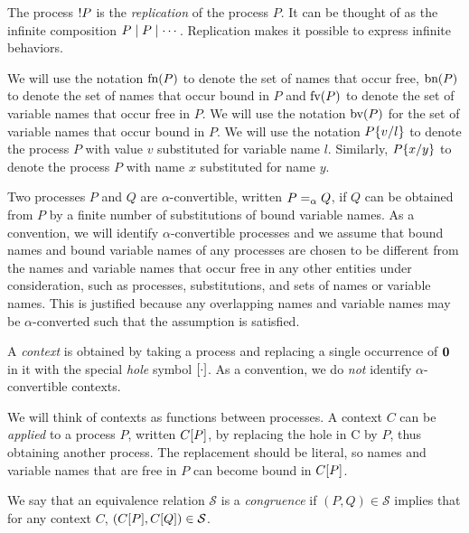 The process \( {!}P \) is the \emph{replication} of the process \( P \).
It can be thought of as the infinite composition \( P \mid P \mid \cdots \).
Replication makes it possible to express infinite behaviors.

We will use the notation \( \textrm{fn}(P) \) to denote the set of
names that occur free,
\( \textrm{bn}(P) \) to denote the set of names that occur bound
in \( P \) and  \( \textrm{fv}(P) \)
to denote the set of variable names that occur free
in \( P \).  We will use the notation \( \textrm{bv}(P) \)
for the set of variable names that occur bound
in \( P \).  We will use the notation \( P\{v/l\} \) to denote
the process \( P \) with value \( v \) substituted for variable name
\( l \). Similarly, \( P\{x/y\} \) to denote the process
\( P \) with name \( x \) substituted for name \( y \).


Two processes \( P \) and \( Q \) are \( \alpha \)-convertible,
written \( P =_{\alpha} Q \), if \( Q \) can be obtained from \( P \)
by a finite number of substitutions of bound variable names.  As a
convention, we will identify \( \alpha \)-convertible processes and we
assume that bound names and bound variable names of any processes are
chosen to be different from the names and variable names that occur
free in any other entities under consideration, such as processes,
substitutions, and sets of names or variable names.  This is justified
because any overlapping names and variable names may be
\( \alpha \)-converted such that the assumption is satisfied.


A \emph{context} is obtained by taking a process and replacing a single occurrence of \( \bm{0} \) in it with the special \emph{hole} symbol \( [\cdot] \).
As a convention, we do \emph{not} identify \( \alpha \)-convertible contexts.

We will think of contexts as functions between processes.
A context \( C \) can be \emph{applied} to a process \( P \), written \( C[P] \), by replacing the hole in C by \( P \), thus obtaining another process.
The replacement should be literal, so names and variable names that are free in \( P \) can become bound in \( C[P] \).

We say that an equivalence relation \( \mathcal{S} \) is a \emph{congruence} if \( (P,Q) \in \mathcal{S} \) implies that for any context \( C \), \( (C[P], C[Q]) \in \mathcal{S} \).

